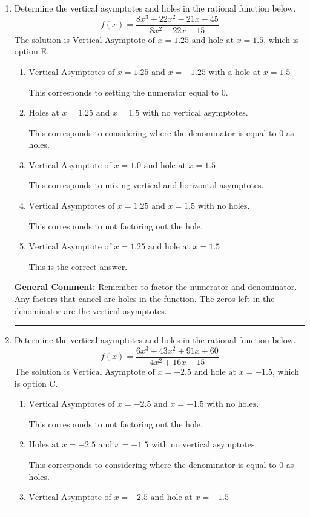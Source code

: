 \documentclass{extbook}[14pt]
\newcommand{\litem}[1]{\item #1

\rule{\textwidth}{0.4pt}}
\begin{document}
\begin{enumerate}\litem{
Determine the vertical asymptotes and holes in the rational function below.
\[ f(x) = \frac{8x^{3} +22 x^{2} -21 x -45}{8x^{2} -22 x + 15} \]The solution is \( \text{Vertical Asymptote of } x = 1.25 \text{ and hole at } x = 1.5 \), which is option E.\begin{enumerate}[label=\Alph*.]
\item \( \text{Vertical Asymptotes of } x = 1.25 \text{ and } x = -1.25 \text{ with a hole at } x = 1.5 \)

This corresponds to setting the numerator equal to 0.
\item \( \text{Holes at } x = 1.25 \text{ and } x = 1.5 \text{ with no vertical asymptotes.} \)

This corresponds to considering where the denominator is equal to 0 as holes.
\item \( \text{Vertical Asymptote of } x = 1.0 \text{ and hole at } x = 1.5 \)

This corresponds to mixing vertical and horizontal asymptotes.
\item \( \text{Vertical Asymptotes of } x = 1.25 \text{ and } x = 1.5 \text{ with no holes.} \)

This corresponds to not factoring out the hole.
\item \( \text{Vertical Asymptote of } x = 1.25 \text{ and hole at } x = 1.5 \)

This is the correct answer.
\end{enumerate}

\textbf{General Comment:} Remember to factor the numerator and denominator. Any factors that cancel are holes in the function. The zeros left in the denominator are the vertical asymptotes.
}
\litem{
Determine the vertical asymptotes and holes in the rational function below.
\[ f(x) = \frac{6x^{3} +43 x^{2} +91 x + 60}{4x^{2} +16 x + 15} \]The solution is \( \text{Vertical Asymptote of } x = -2.5 \text{ and hole at } x = -1.5 \), which is option C.\begin{enumerate}[label=\Alph*.]
\item \( \text{Vertical Asymptotes of } x = -2.5 \text{ and } x = -1.5 \text{ with no holes.} \)

This corresponds to not factoring out the hole.
\item \( \text{Holes at } x = -2.5 \text{ and } x = -1.5 \text{ with no vertical asymptotes.} \)

This corresponds to considering where the denominator is equal to 0 as holes.
\item \( \text{Vertical Asymptote of } x = -2.5 \text{ and hole at } x = -1.5 \)


\end{enumerate}}
\end{enumerate}
\end{document}
